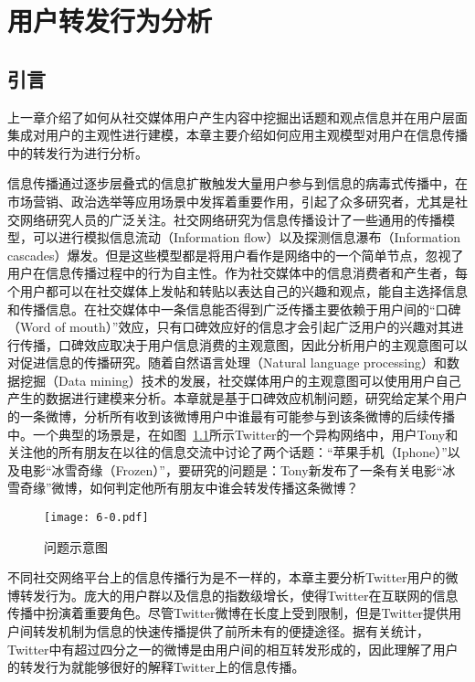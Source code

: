 \chapter{用户转发行为分析}
\label{ch6}

\section{引言}
\label{ch6_intro}
上一章介绍了如何从社交媒体用户产生内容中挖掘出话题和观点信息并在用户层面集成对用户的主观性进行建模，本章主要介绍如何应用主观模型对用户在信息传播中的转发行为进行分析。

信息传播通过逐步层叠式的信息扩散触发大量用户参与到信息的病毒式传播中，在市场营销、政治选举等应用场景中发挥着重要作用，引起了众多研究者，尤其是社交网络研究人员的广泛关注。社交网络研究为信息传播设计了一些通用的传播模型，可以进行模拟信息流动（Information flow）以及探测信息瀑布（Information cascades）爆发。但是这些模型都是将用户看作是网络中的一个简单节点，忽视了用户在信息传播过程中的行为自主性。作为社交媒体中的信息消费者和产生者，每个用户都可以在社交媒体上发帖和转贴以表达自己的兴趣和观点，能自主选择信息和传播信息。在社交媒体中一条信息能否得到广泛传播主要依赖于用户间的“口碑（Word of mouth）”效应，只有口碑效应好的信息才会引起广泛用户的兴趣对其进行传播，口碑效应取决于用户信息消费的主观意图，因此分析用户的主观意图可以对促进信息的传播研究。随着自然语言处理（Natural language processing）和数据挖掘（Data mining）技术的发展，社交媒体用户的主观意图可以使用用户自己产生的数据进行建模来分析。本章就是基于口碑效应机制问题，研究给定某个用户的一条微博，分析所有收到该微博用户中谁最有可能参与到该条微博的后续传播中。一个典型的场景是，在如图~\ref{fig6-0}所示Twitter的一个异构网络中，用户Tony和关注他的所有朋友在以往的信息交流中讨论了两个话题：“苹果手机（Iphone）”以及电影“冰雪奇缘（Frozen）”，要研究的问题是：Tony新发布了一条有关电影“冰雪奇缘”微博，如何判定他所有朋友中谁会转发传播这条微博？

\begin{figure}[htb]
\centering
\texttt{[image: 6-0.pdf]}
\caption{问题示意图}
\label{fig6-0}
\end{figure}

不同社交网络平台上的信息传播行为是不一样的，本章主要分析Twitter用户的微博转发行为。庞大的用户群以及信息的指数级增长，使得Twitter在互联网的信息传播中扮演着重要角色。尽管Twitter微博在长度上受到限制，但是Twitter提供用户间转发机制为信息的快速传播提供了前所未有的便捷途径。据有关统计，Twitter中有超过四分之一的微博是由用户间的相互转发形成的，因此理解了用户的转发行为就能够很好的解释Twitter上的信息传播。

